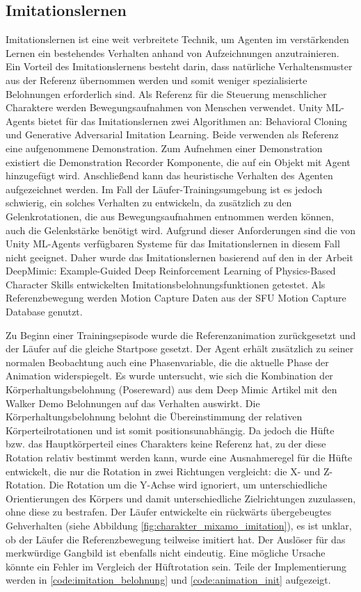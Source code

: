\subsection{Imitationslernen}
Imitationslernen ist eine weit verbreitete Technik, um Agenten im verstärkenden Lernen ein bestehendes Verhalten anhand von Aufzeichnungen anzutrainieren. Ein Vorteil des Imitationslernens besteht darin, dass natürliche Verhaltensmuster aus der Referenz übernommen werden und somit weniger spezialisierte Belohnungen erforderlich sind. Als Referenz für die Steuerung menschlicher Charaktere werden Bewegungsaufnahmen von Menschen verwendet. Unity ML-Agents bietet für das Imitationslernen zwei Algorithmen an: Behavioral Cloning und Generative Adversarial Imitation Learning. Beide verwenden als Referenz eine aufgenommene Demonstration. Zum Aufnehmen einer Demonstration existiert die Demonstration Recorder Komponente, die auf ein Objekt mit Agent hinzugefügt wird. Anschließend kann das heuristische Verhalten des Agenten aufgezeichnet werden. Im Fall der Läufer-Trainingsumgebung ist es jedoch schwierig, ein solches Verhalten zu entwickeln, da zusätzlich zu den Gelenkrotationen, die aus Bewegungsaufnahmen entnommen werden können, auch die Gelenkstärke benötigt wird. Aufgrund dieser Anforderungen sind die von Unity ML-Agents verfügbaren Systeme für das Imitationslernen in diesem Fall nicht geeignet. Daher wurde das Imitationslernen basierend auf den in der Arbeit \grqq{}DeepMimic: Example-Guided Deep Reinforcement Learning of Physics-Based Character Skills\grqq{} entwickelten Imitationsbelohnungsfunktionen getestet.\cite{peng2018deepmimic} Als Referenzbewegung werden Motion Capture Daten aus der \grqq{}SFU Motion Capture Database\grqq{} genutzt.\cite{sfu-motion-capture}

Zu Beginn einer Trainingsepisode wurde die Referenzanimation zurückgesetzt und der Läufer auf die gleiche Startpose gesetzt. Der Agent erhält zusätzlich zu seiner normalen Beobachtung auch eine Phasenvariable, die die aktuelle Phase der Animation widerspiegelt. Es wurde untersucht, wie sich die Kombination der Körperhaltungsbelohnung (Posereward) aus dem Deep Mimic Artikel mit den Walker Demo Belohnungen auf das Verhalten auswirkt. Die Körperhaltungsbelohnung belohnt die Übereinstimmung der relativen Körperteilrotationen und ist somit positionsunabhängig. Da jedoch die Hüfte bzw. das Hauptkörperteil eines Charakters keine Referenz hat, zu der diese Rotation relativ bestimmt werden kann, wurde eine Ausnahmeregel für die Hüfte entwickelt, die nur die Rotation in zwei Richtungen vergleicht: die X- und Z-Rotation. Die Rotation um die Y-Achse wird ignoriert, um unterschiedliche Orientierungen des Körpers und damit unterschiedliche Zielrichtungen zuzulassen, ohne diese zu bestrafen. Der Läufer entwickelte ein rückwärts übergebeugtes Gehverhalten (siehe Abbildung \ref{fig:charakter_mixamo_imitation}), es ist unklar, ob der Läufer die Referenzbewegung teilweise imitiert hat. Der Auslöser für das merkwürdige Gangbild ist ebenfalls nicht eindeutig. Eine mögliche Ursache könnte ein Fehler im Vergleich der Hüftrotation sein. Teile der Implementierung werden in \ref{code:imitation_belohnung} und \ref{code:animation_init} aufgezeigt.

